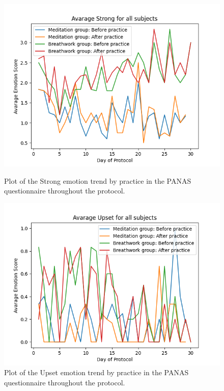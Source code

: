 \begin{figure}
    \centering
    \begin{minipage}{0.49\linewidth}
        \includegraphics[width=\linewidth]{Figures/panas/emotions/Strong.png}
        \caption{Plot of the Strong emotion trend by practice in the PANAS questionnaire throughout the protocol.}
        \label{fig:strong_by_practice}
    \end{minipage}
    \hfill %
    \begin{minipage}{0.49\linewidth}
        \includegraphics[width=\linewidth]{Figures/panas/emotions/Upset.png}
        \caption{Plot of the Upset emotion trend by practice in the PANAS questionnaire throughout the protocol.}
        \label{fig:upset_by_practice}
    \end{minipage}
\end{figure} %